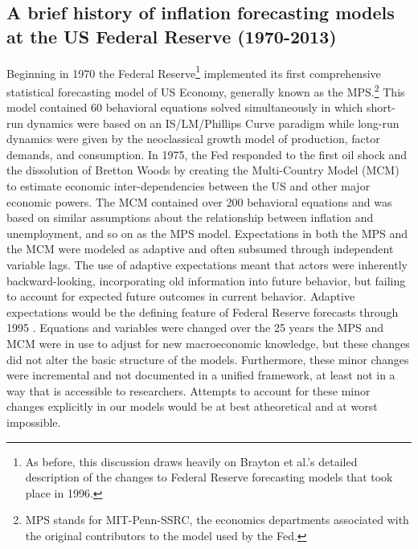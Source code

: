 \documentclass[a4paper]{article}\usepackage[]{graphicx}\usepackage[]{color}
\begin{document}
\subsection*{A brief history of inflation forecasting models at the US Federal Reserve (1970-2013)}

Beginning in 1970 the Federal Reserve\footnote{As before, this discussion draws heavily on Brayton et al.'s \citeyear{Brayton1997} detailed description of the changes to Federal Reserve forecasting models that took place in 1996.} implemented its first comprehensive statistical forecasting model of US Economy, generally known as the MPS.\footnote{MPS stands for MIT-Penn-SSRC, the economics departments associated with the original contributors to the model used by the Fed.} This model contained 60 behavioral equations solved simultaneously in which short-run dynamics were based on an IS/LM/Phillips Curve paradigm while long-run dynamics were given by the neoclassical growth model of production, factor demands, and consumption. In 1975, the Fed responded to the first oil shock and the dissolution of Bretton Woods by creating the Multi-Country Model (MCM) to estimate economic inter-dependencies between the US and other major economic powers. The MCM contained over 200 behavioral equations and was based on similar assumptions about the relationship between inflation and unemployment, and so on as the MPS model. Expectations in both the MPS and the MCM were modeled as adaptive and often subsumed through independent variable lags. The use of adaptive expectations meant that actors were inherently backward-looking, incorporating old information into future behavior, but failing to account for expected future outcomes in current behavior. Adaptive expectations would be the defining feature of Federal Reserve forecasts through 1995 \citep[45]{Brayton1997}. Equations and variables were changed over the 25 years the MPS and MCM were in use to adjust for new macroeconomic knowledge, but these changes did not alter the basic structure of the models. Furthermore, these minor changes were incremental and not documented in a unified framework, at least not in a way that is accessible to researchers. Attempts to account for these minor changes explicitly in our models would be at best atheoretical and at worst impossible.
\end{document}
